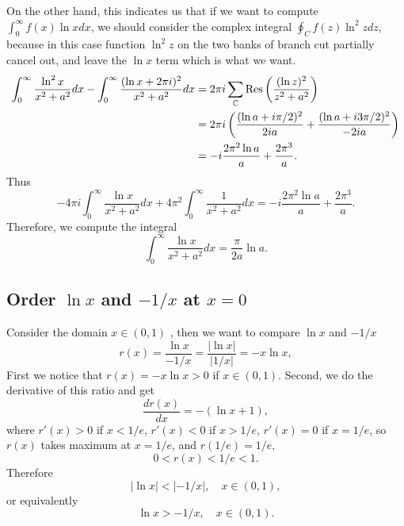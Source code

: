 \documentclass[10pt]{article}
\begin{document}
	On the other hand, this indicates us that if we want to compute $\int_0^{\infty} f(x) \ln x dx$, we should consider the complex integral $\oint_C f(z) \ln^2 z dz$, because in this case function $\ln^2 z$ on the two banks of branch cut partially cancel out, and leave the $\ln x$ term which is what we want.
	\begin{align*}
		\int_{0}^{\infty} \frac{\ln^2 x}{x^2 + a^2} dx - \int_{0}^{\infty} \frac{(\ln x + 2\pi i)^2}{x^2 + a^2} dx &= 2\pi i \sum_{\mathbb{C}} \Res\left(\frac{(\ln z)^2}{z^2 + a^2}\right) \\
		&= 2\pi i \left(\frac{(\ln a + i \pi/2)^2}{2ia} + \frac{(\ln a + i 3\pi/2)^2}{-2ia}\right) \\
		&= -i \frac{2\pi^2\ln a}{a} + \frac{2\pi^3}{a}.
	\end{align*}
	Thus
	\begin{equation}
		-4\pi i \int_{0}^{\infty} \frac{\ln x}{x^2 + a^2} dx + 4 \pi^2 \int_0^{\infty} \frac{1}{x^2 + a^2} dx = -i \frac{2\pi^2\ln a}{a} + \frac{2\pi^3}{a}.
	\end{equation}
	Therefore, we compute the integral
	\begin{equation}
		\int_{0}^{\infty} \frac{\ln x}{x^2 + a^2} dx = \frac{\pi}{2a}\ln a.
	\end{equation}

	\subsection{Order $\ln x$ and $-1/x$ at $x=0$}

	Consider the domain $x \in (0,1)$ , then we want to compare $\ln x$ and $-1/x$
	\begin{equation}
		r(x) = \frac{\ln x}{-1/x} = \frac{|\ln x|}{|1/x|} = -x\ln x,
	\end{equation}
	First we notice that $r(x) = -x \ln x > 0$ if $x \in (0,1)$.  Second, we do the derivative of this ratio and get
	\begin{equation}
		\frac{d r(x)}{dx} = -(\ln x +1),
	\end{equation}
	where $r'(x) > 0$ if $x < 1/e$, $r'(x) < 0$ if $x > 1/e$, $r'(x) = 0$ if $x = 1/e$, so $r(x)$ takes maximum at $x = 1/e$, and $r(1/e) = 1/e$,
	\begin{equation}
		0< r(x) < 1/e < 1.
	\end{equation}
	Therefore
	\begin{equation}
		|\ln x| < |- 1/x|, \quad x \in (0,1),
	\end{equation}
	or equivalently
	\begin{equation}
		\ln x > - 1/x, \quad x \in (0,1).
	\end{equation}
\end{document}
